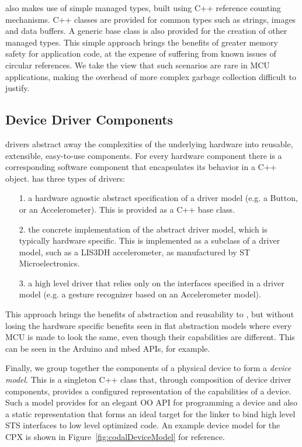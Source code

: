 \CO also makes use of simple managed types, built using C++ reference counting mechanisms. C++ classes are provided for common types such as strings, images and data buffers. A generic base class is also provided for the creation of other managed types. This simple approach brings the benefits of greater memory safety for application code, at the expense of suffering from known issues of circular references. We take the view that such scenarios are rare in MCU applications, making the overhead of more complex garbage collection difficult to justify.

\subsection{Device Driver Components}
\CO drivers abstract away the complexities of the underlying hardware into reusable, extensible, easy-to-use components. For every hardware component there is a corresponding software component that encapsulates its behavior in a C++ object. \CO has three types of drivers:
\begin{itemize}
    \item[1.] a hardware agnostic abstract specification of a driver model (e.g. a Button, or an Accelerometer). This is provided as a C++ base class.
    \item[2.] the concrete implementation of the abstract driver model, which is typically hardware specific. This is implemented as a subclass of a driver model, such as a LIS3DH accelerometer, as manufactured by ST Microelectronics.
    \item[3.] a high level driver that relies only on the interfaces specified in a driver model (e.g. a gesture recognizer based on an Accelerometer model).

\end{itemize}

This approach brings the benefits of abstraction and reusability to \CON, but without losing the hardware specific benefits seen in flat abstraction models where every MCU is made to look the same, even though their capabilities are different. This can be seen in the Arduino and mbed APIs, for example.

Finally, we group together the components of a physical device to form a \emph{device model}. This is a singleton C++ class that, through composition of device driver components, provides a configured representation of the capabilities of a device. Such a model provides for an elegant OO API for programming a device and also a static representation that forms an ideal target for the \MC linker to bind high level STS interfaces to low level optimized code. An example device model for the CPX is shown in Figure~\ref{fig:codalDeviceModel} for reference.

